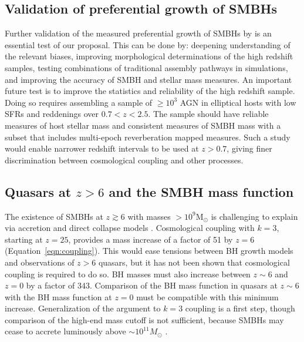 \documentclass[twocolumn,twocolappendix]{aastex631}
\begin{document}
\subsection{Validation of preferential growth of SMBHs}
  Further validation of the measured preferential growth of SMBHs by \citet{farrah22b} is an essential test of our proposal.   
  This can be done by: deepening understanding of the relevant biases, improving morphological determinations of the high redshift samples, testing combinations of traditional assembly pathways in simulations, and improving the accuracy of SMBH and stellar mass measures.
An important future test is to improve the statistics and reliability of the high redshift sample.
Doing so requires assembling a sample of $\geqslant 10^{3}$ AGN in elliptical hosts with low SFRs and reddenings over $0.7<z<2.5$.
The sample should have reliable measures of host stellar mass and consistent measures of SMBH mass with a subset that includes multi-epoch reverberation mapped measures.
Such a study would enable narrower redshift intervals to be used at $z>0.7$, giving finer discrimination between cosmological coupling and other processes.

\subsection{Quasars at $z>6$ and the SMBH mass function}
The existence of SMBHs at $z\gtrsim6$ \citep[e.g.][]{trakh15} with masses $>10^{9}$M$_{\odot}$ is challenging to explain via accretion and direct collapse models \citep[e.g.][]{inayoshi2020seeds,volonteri2021origins}.
Cosmological coupling with $k = 3$, starting at $z = 25$, provides a mass increase of a factor of 51 by $z = 6$ (Equation~\ref{eqn:coupling}).
This would ease tensions between BH growth models and observations of $z>6$ quasars, but it has not been shown that cosmological coupling is required to do so.
BH masses must also increase between $z \sim 6$ and $z = 0$ by a factor of $343$.
Comparison of the BH mass function in quasars at $z \sim 6$ with the BH mass function at $z = 0$ must be compatible with this minimum increase.
Generalization of the \citet{soltan1982masses} argument to $k=3$ coupling is a first step, though comparison of the high-end mass cutoff is not sufficient, because SMBHs may cease to accrete luminously above $\sim 10^{11}M_\odot$ \citep[e.g.][]{king2015big, inayoshi2016there, carr2021constraints}.
\end{document}
